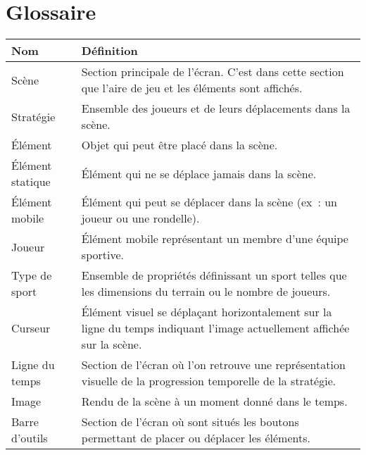 \chapter{Glossaire}
\label{s:glossaire}

\begin{tabular}{|l|p{12cm}|}
	\hline
	Nom & Définition \\
	\hline
	Scène 				& Section principale de l'écran. C'est dans cette section que l'aire de jeu et les éléments sont affichés. \\
	Stratégie  			& Ensemble des joueurs et de leurs déplacements dans la scène. \\
	Élément 			& Objet qui peut être placé dans la scène. \\
	Élément statique 	& Élément qui ne se déplace jamais dans la scène. \\
	Élément mobile 		& Élément qui peut se déplacer dans la scène (ex~: un joueur ou une rondelle). \\
	Joueur				& Élément mobile représentant un membre d'une équipe sportive. \\
	Type de sport		& Ensemble de propriétés définissant un sport telles que les dimensions du terrain ou le nombre de joueurs. \\
	Curseur 			& Élément visuel se déplaçant horizontalement sur la ligne du temps indiquant l'image actuellement affichée sur la scène. \\
	Ligne du temps 		& Section de l'écran où l'on retrouve une représentation visuelle de la progression temporelle de la stratégie. \\
	Image				& Rendu de la scène à un moment donné dans le temps. \\
	Barre d'outils 		& Section de l'écran où sont situés les boutons permettant de placer ou déplacer les éléments. \\
	\hline
\end{tabular}
